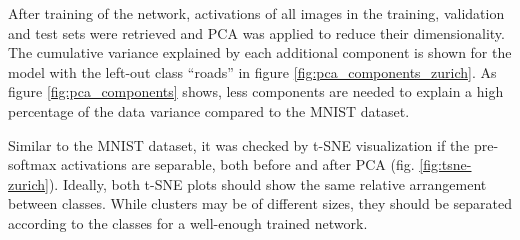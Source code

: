 \documentclass[10pt]{article}
\begin{document}
After training of the network, activations of all images in the training, validation and test sets were retrieved and \gls{PCA} was applied to reduce their dimensionality. The cumulative variance explained by each additional component is shown for the model with the left-out class ``roads'' in figure \ref{fig:pca_components_zurich}. As figure \ref{fig:pca_components} shows, less components are needed to explain a high percentage of the data variance compared to the \gls{MNIST} dataset. 

Similar to the \gls{MNIST} dataset, it was checked by \gls{t-SNE} visualization if the pre-softmax activations are separable, both before and after \gls{PCA} (fig. \ref{fig:tsne-zurich}). Ideally, both t-SNE plots should show the same relative arrangement between classes. While clusters may be of different sizes, they should be separated according to the classes for a well-enough trained network.
\end{document}
